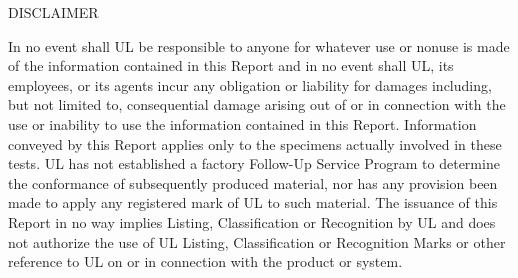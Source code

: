 \documentclass{article}
\begin{document}
\clearpage

\begin{center}
DISCLAIMER\\
\vspace*{\baselineskip}
\begin{adjustwidth}{-0.25in}{-0.25in}
In no event shall UL be responsible to anyone for whatever use or nonuse is made of the information contained in this Report and in no event shall UL, its employees, or its agents incur any obligation or liability for damages including, but not limited to, consequential damage arising out of or in connection  with the use or inability to use the information contained in this Report. Information conveyed by this Report applies only to the specimens actually involved in these tests. UL has not established a factory Follow-Up Service Program to determine the conformance of subsequently produced material, nor has any provision been made to apply any registered mark of UL to such material. The issuance of this Report in no way implies Listing, Classification or Recognition by UL and does not authorize the use of UL Listing, Classification or Recognition Marks or other reference to UL on or in connection with the product or system.
\end{adjustwidth}
\end{center}


\clearpage

\renewcommand{\abstractname}{Executive Summary}
\setlength{\emergencystretch}{5pt}
\end{document}
